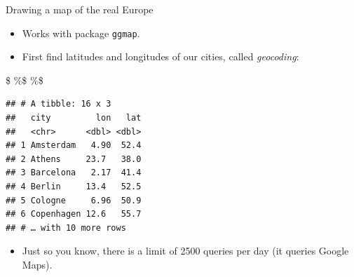 \documentclass[ignorenonframetext,]{beamer}
\newenvironment{Shaded}{\begin{snugshade}}{\end{snugshade}}
\newcommand{\DataTypeTok}[1]{\textcolor[rgb]{0.13,0.29,0.53}{#1}}
\newcommand{\DecValTok}[1]{\textcolor[rgb]{0.00,0.00,0.81}{#1}}
\newcommand{\KeywordTok}[1]{\textcolor[rgb]{0.13,0.29,0.53}{\textbf{#1}}}
\newcommand{\NormalTok}[1]{#1}
\newcommand{\OperatorTok}[1]{\textcolor[rgb]{0.81,0.36,0.00}{\textbf{#1}}}
\newcommand{\StringTok}[1]{\textcolor[rgb]{0.31,0.60,0.02}{#1}}
\providecommand{\tightlist}{%
  \setlength{\itemsep}{0pt}\setlength{\parskip}{0pt}}
\begin{document}
\begin{frame}[fragile]{Drawing a map of the real Europe}
\protect\hypertarget{drawing-a-map-of-the-real-europe}{}

\begin{itemize}
\item
  Works with package \texttt{ggmap}.
\item
  First find latitudes and longitudes of our cities, called
  \emph{geocoding}:
\end{itemize}

\begin{Shaded}
\end{Shaded}

\$ \%\$ \%\$

\begin{verbatim}
## # A tibble: 16 x 3
##   city         lon   lat
##   <chr>      <dbl> <dbl>
## 1 Amsterdam   4.90  52.4
## 2 Athens     23.7   38.0
## 3 Barcelona   2.17  41.4
## 4 Berlin     13.4   52.5
## 5 Cologne     6.96  50.9
## 6 Copenhagen 12.6   55.7
## # … with 10 more rows
\end{verbatim}

\begin{itemize}
\tightlist
\item
  Just so you know, there is a limit of 2500 queries per day (it queries
  Google Maps).
\end{itemize}

\end{frame}
\end{document}
